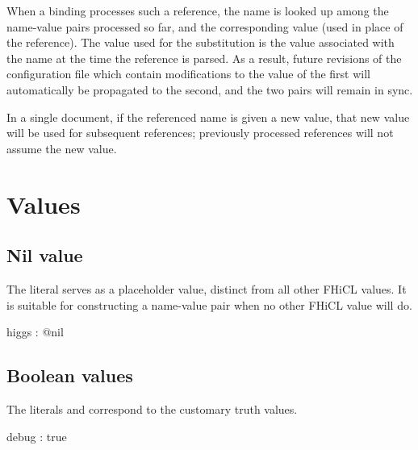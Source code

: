 \documentclass[draftmode,draftwater]{memarticle}
\newcommand{\fhicl}%
 {FHiCL\xspace}
\begin{document}
When a binding processes such a reference, the name is looked up among
the name-value pairs processed so far, and the corresponding value
 (used in place of the reference).  The value used
for the substitution is the value associated with the name at the time
the reference is parsed.  As a result, future revisions of the
configuration file which contain modifications to the value of the
first will automatically be propagated to the second, and the two
pairs will remain in sync.

In a single document, if the referenced name is given a new value,
that new value will be used for subsequent references; previously
processed references will not assume the new value.

\chapter{Values}

%

\section{Nil value}

The literal 
serves as a placeholder value,
distinct from all other \fhicl values.
It is suitable for constructing a name-value pair
when no other \fhicl value will do.
%
\Needspace{0.17in}
\begin{fcllisting}[texcl,escapechar=`]
higgs : @nil
\end{fcllisting}

\section{Boolean values}

The literals  and  correspond to the
customary truth values.  
%
\Needspace{0.17in}
\begin{fcllisting}[texcl,escapechar=`]
debug : true
\end{fcllisting}
\end{document}
